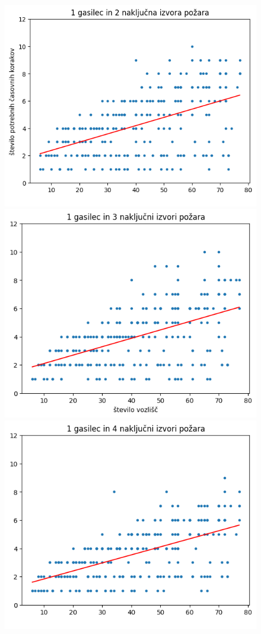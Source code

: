 \documentclass[a4paper, 12pt]{article}
\begin{document}
\begin{figure}[!htb]
      \includegraphics[width=\linewidth]{plot12}
    \endminipage\hfill
      \includegraphics[width=\linewidth]{plot13}
    \endminipage\hfill
      \includegraphics[width=\linewidth]{plot14}

\end{figure}
\end{document}
